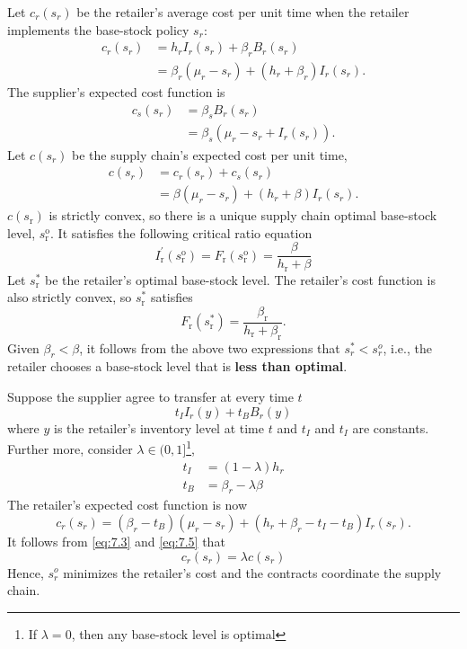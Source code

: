 Let $c_r(s_r)$ be the retailer's average cost per unit time when the retailer implements the base-stock policy $s_r$:
\begin{align*}
    c_r(s_r)&=h_r I_r(s_r)+\beta_r B_r(s_r)\\
    &=\beta_r(\mu_r-s_r)+(h_r+\beta_r)I_r(s_r).
\end{align*}
The supplier's expected cost function is 
\begin{align*}
    c_s(s_r)&=\beta_s B_r(s_r)\\
    &=\beta_s(\mu_r-s_r+I_r(s_r)).
\end{align*}
Let $c(s_r)$ be the supply chain's expected cost per unit time,
\begin{align}
    c(s_r)&=c_r(s_r)+c_s(s_r)\nonumber\\
    &=\beta(\mu_r-s_r)+(h_r+\beta)I_r(s_r).\label{eq:7.3}
\end{align}
$c\left(s_{\mathrm{r}}\right)$ is strictly convex, so there is a unique supply chain optimal base-stock level, $s_{\mathrm{r}}^{\mathrm{o}}$. It satisfies the following critical ratio equation
$$
I_{\mathrm{r}}^{\prime}\left(s_{\mathrm{r}}^{\mathrm{o}}\right)=F_{\mathrm{r}}\left(s_{\mathrm{r}}^{\mathrm{o}}\right)=\frac{\beta}{h_{\mathrm{r}}+\beta}
$$
Let $s_{\mathrm{r}}^{*}$ be the retailer's optimal base-stock level. The retailer's cost function is also strictly convex, so $s_{\mathrm{r}}^{*}$ satisfies
$$
F_{\mathrm{r}}\left(s_{\mathrm{r}}^{*}\right)=\frac{\beta_{\mathrm{r}}}{h_{\mathrm{r}}+\beta_{\mathrm{r}}} .
$$
Given 	$\beta_r<\beta$, it follows from the above two expressions that $s_r^* < s_r^o$, i.e., the retailer chooses a base-stock level that is \textbf{less than optimal}.

Suppose the supplier agree to transfer at every time $t$
$$t_I I_r(y)+t_B B_r(y)$$
where $y$ is the retailer's inventory level at time $t$ and $t_I$ and $t_I$ are constants. Further more, consider $\lambda\in(0,1]$\footnote{If $\lambda=0$, then any base-stock level is optimal},
\begin{align*}
    t_I&=(1-\lambda)h_r\\
    t_B&=\beta_r-\lambda\beta
\end{align*}
The retailer's expected cost function is now 
\begin{equation}\label{eq:7.5}
    c_r(s_r)=(\beta_r-t_B)(\mu_r-s_r)+(h_r+\beta_r-t_I-t_B)I_r(s_r).
\end{equation}
It follows from \autoref{eq:7.3} and \autoref{eq:7.5} that
\begin{equation}
    c_r(s_r)=\lambda c(s_r)\label{eq:7.6}
\end{equation}
Hence, $s_r^o$ minimizes the retailer's cost and the contracts coordinate the supply chain. 




